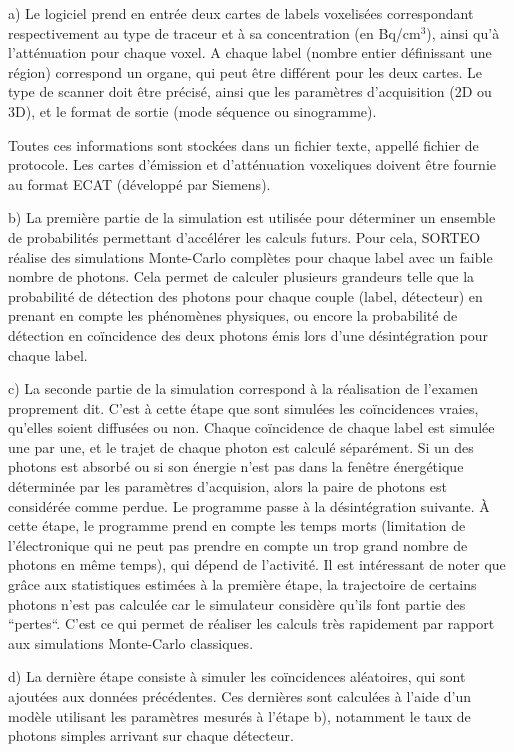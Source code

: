 a) Le logiciel prend en entrée deux cartes de labels voxelisées correspondant respectivement au type de traceur et à sa concentration (en Bq/cm$^3$), ainsi qu'à l'atténuation pour chaque voxel. A chaque label (nombre entier définissant une région) correspond un organe, qui peut être différent pour les deux cartes. Le type de scanner doit être précisé, ainsi que les paramètres d'acquisition (2D ou 3D), et le format de sortie (mode séquence ou sinogramme).

Toutes ces informations sont stockées dans un fichier texte, appellé fichier de protocole. Les cartes d'émission et d'atténuation voxeliques doivent être fournie au format ECAT (développé par Siemens).

b) La première partie de la simulation est utilisée pour déterminer un ensemble de probabilités permettant d'accélérer les calculs futurs. Pour cela, SORTEO réalise des simulations Monte-Carlo complètes pour chaque label avec un faible nombre de photons. Cela permet de calculer plusieurs grandeurs telle que la probabilité de détection des photons pour chaque couple (label, détecteur) en prenant en compte les phénomènes physiques, ou encore la probabilité de détection en coïncidence des deux photons émis lors d'une désintégration pour chaque label.

c) La seconde partie de la simulation correspond à la réalisation de l'examen proprement dit. C'est à cette étape que sont simulées les coïncidences vraies, qu'elles soient diffusées ou non. Chaque coïncidence de chaque label est simulée une par une, et le trajet de chaque photon est calculé séparément. Si un des photons est absorbé ou si son énergie n'est pas dans la fenêtre énergétique déterminée par les paramètres d'acquision, alors la paire de photons est considérée comme perdue. Le programme passe à la désintégration suivante. \`A cette étape, le programme prend en compte les temps morts (limitation de l'électronique qui ne peut pas prendre en compte un trop grand nombre de photons en même temps), qui dépend de l'activité. Il est intéressant de noter que grâce aux statistiques estimées à la première étape, la trajectoire de certains photons n'est pas calculée car le simulateur considère qu'ils font partie des ``pertes``. C'est ce qui permet de réaliser les calculs très rapidement par rapport aux simulations Monte-Carlo classiques.

d) La dernière étape consiste à simuler les coïncidences aléatoires, qui sont ajoutées aux données précédentes. Ces dernières sont calculées à l'aide d'un modèle utilisant les paramètres mesurés à l'étape b), notamment le taux de photons simples arrivant sur chaque détecteur.


